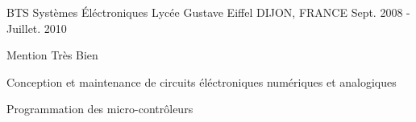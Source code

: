 \begin{cventries}
  \cventry
    {BTS Systèmes \'Eléctroniques} %
    {Lycée Gustave Eiffel} %
    {DIJON, FRANCE} %
    {Sept. 2008 - Juillet. 2010} %
    {
      \begin{cvitems} %
      \item {Mention Très Bien}
      \item {Conception et maintenance de circuits éléctroniques numériques et analogiques}
      \item {Programmation des micro-contrôleurs}
      \end{cvitems}
    }
\end{cventries}

